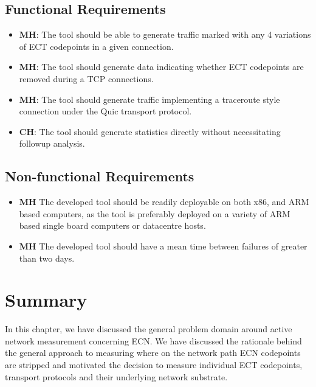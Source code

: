\documentclass{l4proj}
\begin{document}
\subsection{Functional Requirements}

\begin{itemize}
    \item \textbf{MH}: The tool should be able to generate traffic marked with any 4 variations of ECT codepoints in a given connection.
    \item \textbf{MH}: The tool should generate data indicating whether ECT codepoints are removed during a TCP connections.
    \item \textbf{MH}: The tool should generate traffic implementing a traceroute style connection under the Quic transport protocol.
    \item \textbf{CH}: The tool should generate statistics directly without necessitating followup analysis.
\end{itemize}



\subsection{Non-functional Requirements}

\begin{itemize}
    \item \textbf{MH} The developed tool should be readily deployable on both x86, and ARM based computers, as the tool is preferably deployed on a variety of ARM based single board computers or datacentre hosts.
    \item \textbf{MH} The developed tool should have a mean time between failures of greater than two days.
\end{itemize}

\section{Summary}

In this chapter, we have discussed the general problem domain around active network measurement concerning ECN. We have discussed the rationale behind the general approach to measuring where on the network path ECN codepoints are stripped and motivated the decision to measure individual ECT codepoints, transport protocols and their underlying network substrate.




\end{document}
